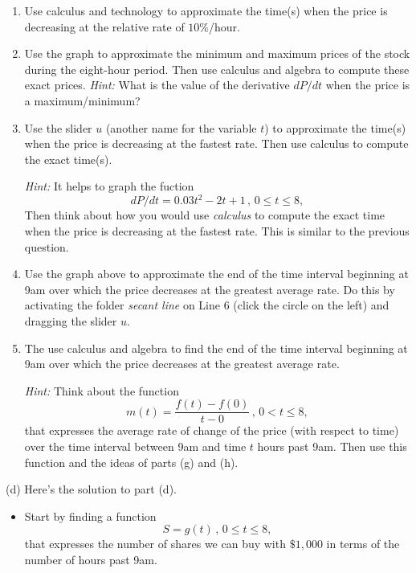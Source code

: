 \documentclass{ximera}
\begin{document}
\begin{question}
\begin{enumerate}
\item  Use calculus and technology to approximate the time(s) when the price is decreasing at the relative rate of $10\%$/hour.


\item Use the graph to approximate the minimum and maximum prices of the stock during the eight-hour period. Then use calculus and algebra to compute these exact prices. \emph{Hint:} What is the value of the derivative $dP/dt$ when the price is a maximum/minimum?


\item Use the slider $u$ (another name for the variable $t$) to approximate the time(s) when the price is decreasing at the fastest rate. Then use calculus to compute the exact time(s). 

\emph{Hint:} It helps to graph the fuction
\[
  dP/dt = 0.03t^2 - 2t + 1 \, , \, 0\leq t \leq 8 ,
\]
Then think about how you would use \emph{calculus} to compute the exact time when the price is decreasing at the fastest rate. This is similar to the previous question. 




\item Use the graph above to approximate the end of the time interval beginning at 9am over which the price decreases at the greatest average rate.  Do this by activating the folder \emph{secant line} on Line 6 (click the circle on the left) and dragging the slider $u$.

\item The use calculus and algebra to find the end of the time interval beginning at 9am over which the price decreases at the greatest average rate.  

\emph{Hint:} Think about the function
\[
     m(t) = \frac{f(t)-f(0)}{t-0} \, , \, 0 < t\leq 8 ,
\]
that expresses the average rate of change of the price (with respect to time) over the time interval between 9am and time $t$ hours past 9am. Then use this function and the ideas of parts (g) and (h).

\end{enumerate}

\begin{explanation}
(d) Here's the solution to part (d).

\begin{itemize}
\item Start by finding a function 
\[
   S = g(t) \, , \, 0\leq t \leq 8 ,
\]
that expresses the number of shares we can buy with $\$1,000$ in terms of the number of hours past 9am. 


\end{itemize}
\end{explanation}
\end{question}
\end{document}
